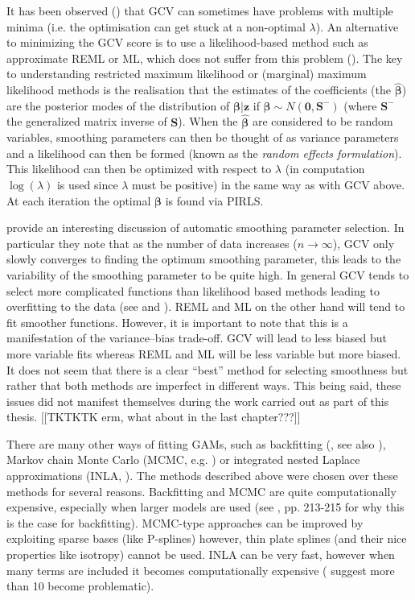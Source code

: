 It has been observed (\cite{reissogden}) that GCV can sometimes have problems with multiple minima (i.e. the optimisation can get stuck at a non-optimal $\lambda$). An alternative to minimizing the GCV score is to use a likelihood-based method such as approximate REML or ML, which does not suffer from this problem (\cite{remlpaper}). The key to understanding restricted maximum likelihood or (marginal) maximum likelihood methods is the realisation that the estimates of the coefficients (the $\bm{\hat{\beta}}$) are the posterior modes of the distribution of $\bm{\beta}|\mathbf{z}$ if $\bm{\beta} \sim N(\mathbf{0},\mathbf{S}^-)$ (where $\mathbf{S}^-$ the generalized matrix inverse of $\mathbf{S}$). When the $\bm{\hat{\beta}}$ are considered to be random variables, smoothing parameters can then be thought of as variance parameters and a likelihood can then be formed (known as the \textit{random effects formulation}).  This likelihood can then be optimized with respect to $\lambda$ (in computation $\log(\lambda)$ is used since $\lambda$ must be positive) in the same way as with GCV above. At each iteration the optimal $\bm{\beta}$ is found via PIRLS.

 provide an interesting discussion of automatic smoothing parameter selection. In particular they note that as the number of data increases ($n\rightarrow\infty$), GCV only slowly converges to finding the optimum smoothing parameter, this leads to the variability of the smoothing parameter to be quite high. In general GCV tends to select more complicated functions than likelihood based methods leading to overfitting to the data (see \cite{remlpaper} and \cite{reissogden}). REML and ML on the other hand will tend to fit smoother functions. However, it is important to note that this is a manifestation of the variance--bias trade-off. GCV will lead to less biased but more variable fits whereas REML and ML will be less variable but more biased. It does not seem that there is a clear ``best'' method for selecting smoothness but rather that both methods are imperfect in different ways. This being said, these issues did not manifest themselves during the work carried out as part of this thesis. [[TKTKTK erm, what about in the last chapter???]]

There are many other ways of fitting GAMs, such as backfitting (\cite{gammonograph}, see also ), Markov chain Monte Carlo (MCMC, e.g. \cite{fahrmeir2004}) or integrated nested Laplace approximations (INLA, \cite{inla}). The methods described above were chosen over these methods for several reasons. Backfitting and MCMC are quite computationally expensive, especially when larger models are used (see \cite{simonbook}, pp. 213-215 for why this is the case for backfitting). MCMC-type approaches can be improved by exploiting sparse bases (like P-splines) however, thin plate splines (and their nice properties like isotropy) cannot be used. INLA can be very fast, however when many terms are included it becomes computationally expensive (\cite{inla} suggest more than 10 become problematic).

